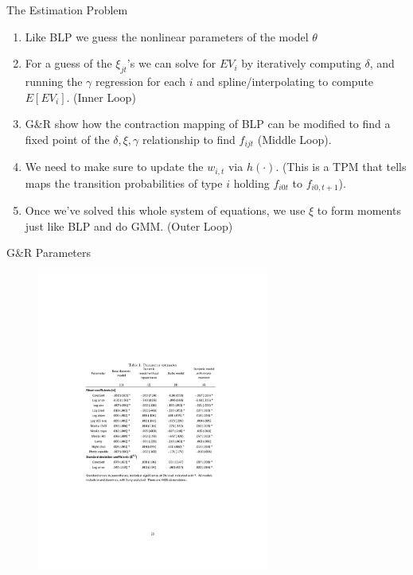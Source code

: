 \documentclass[xcolor=pdftex,dvipsnames,table,mathserif,aspectratio=169]{beamer}
\begin{document}
\begin{frame}{The Estimation Problem}
\begin{enumerate}
\item Like BLP we guess the nonlinear parameters of the model $\theta$
\item For a guess of the $\xi_{jt}$'s we can solve for $EV_i$ by iteratively computing $\delta$, and running the $\gamma$ regression for each $i$ and spline/interpolating to compute $E[EV_i]$. (Inner Loop)
\item G\&R show how the contraction mapping of BLP can be modified to find a fixed point of the $\delta,\xi,\gamma$ relationship to find $f_{ijt}$ (Middle Loop).
\item We need to make sure to update the $w_{i,t}$ via $h(\cdot)$.  (This is a TPM that tells maps the transition probabilities of type $i$ holding $f_{i0t}$ to $f_{i0,t+1}$).
\item Once we've solved this whole system of equations, we use $\xi$ to form moments just like BLP and do GMM. (Outer Loop)
\end{enumerate}
\end{frame}

\begin{frame}{G\&R Parameters}
\begin{figure}[htbp]
\begin{center}
\includegraphics[width=3in]{resources/gandrtable1.pdf}
\end{center}
\end{figure}
\end{frame}
\end{document}
